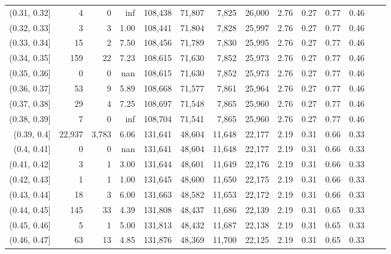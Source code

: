 \begin{tabular}{rrrrrrrrrrrrrr}
(0.31, 0.32]   &       4 &      0 &    inf &  108,438 &   71,807 &   7,825 &  26,000 &  2.76 &  0.27 &  0.77 &      0.46 \\
(0.32, 0.33]   &       3 &      3 &   1.00 &  108,441 &   71,804 &   7,828 &  25,997 &  2.76 &  0.27 &  0.77 &      0.46 \\
(0.33, 0.34]   &      15 &      2 &   7.50 &  108,456 &   71,789 &   7,830 &  25,995 &  2.76 &  0.27 &  0.77 &      0.46 \\
(0.34, 0.35]   &     159 &     22 &   7.23 &  108,615 &   71,630 &   7,852 &  25,973 &  2.76 &  0.27 &  0.77 &      0.46 \\
(0.35, 0.36]   &       0 &      0 &    nan &  108,615 &   71,630 &   7,852 &  25,973 &  2.76 &  0.27 &  0.77 &      0.46 \\
(0.36, 0.37]   &      53 &      9 &   5.89 &  108,668 &   71,577 &   7,861 &  25,964 &  2.76 &  0.27 &  0.77 &      0.46 \\
(0.37, 0.38]   &      29 &      4 &   7.25 &  108,697 &   71,548 &   7,865 &  25,960 &  2.76 &  0.27 &  0.77 &      0.46 \\
(0.38, 0.39]   &       7 &      0 &    inf &  108,704 &   71,541 &   7,865 &  25,960 &  2.76 &  0.27 &  0.77 &      0.46 \\
(0.39, 0.4]    &  22,937 &  3,783 &   6.06 &  131,641 &   48,604 &  11,648 &  22,177 &  2.19 &  0.31 &  0.66 &      0.33 \\
(0.4, 0.41]    &       0 &      0 &    nan &  131,641 &   48,604 &  11,648 &  22,177 &  2.19 &  0.31 &  0.66 &      0.33 \\
(0.41, 0.42]   &       3 &      1 &   3.00 &  131,644 &   48,601 &  11,649 &  22,176 &  2.19 &  0.31 &  0.66 &      0.33 \\
(0.42, 0.43]   &       1 &      1 &   1.00 &  131,645 &   48,600 &  11,650 &  22,175 &  2.19 &  0.31 &  0.66 &      0.33 \\
(0.43, 0.44]   &      18 &      3 &   6.00 &  131,663 &   48,582 &  11,653 &  22,172 &  2.19 &  0.31 &  0.66 &      0.33 \\
(0.44, 0.45]   &     145 &     33 &   4.39 &  131,808 &   48,437 &  11,686 &  22,139 &  2.19 &  0.31 &  0.65 &      0.33 \\
(0.45, 0.46]   &       5 &      1 &   5.00 &  131,813 &   48,432 &  11,687 &  22,138 &  2.19 &  0.31 &  0.65 &      0.33 \\
(0.46, 0.47]   &      63 &     13 &   4.85 &  131,876 &   48,369 &  11,700 &  22,125 &  2.19 &  0.31 &  0.65 &      0.33 \\

\end{tabular}
